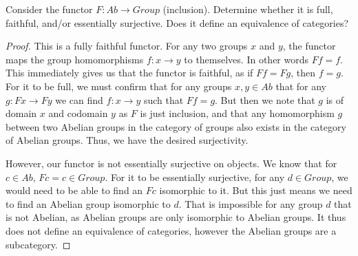 \documentclass[main.tex]{subfiles}
\begin{document}
%

\begin{exercise}
	Consider the functor $F: Ab \rightarrow Group$ (inclusion).  Determine whether it is full, faithful, and/or essentially surjective.  Does it define an equivalence of categories?
\end{exercise}

\begin{proof}
	This is a fully faithful functor. For any two groups $x$ and $y$, the functor maps the group homomorphisms $f: x \rightarrow y$ to themselves.  In other words $Ff = f$.  This immediately gives us that the functor is faithful, as if $Ff = Fg$, then $f = g$.  
For it to be full, we must confirm that for any groups $x,y \in Ab$ that for any $g: Fx \rightarrow Fy$ we can find $f: x \rightarrow y$ such that $Ff = g$.  But then we note that $g$ is of domain $x$ and codomain $y$ as $F$ is just inclusion, and that any homomorphism $g$ between two Abelian groups in the category of groups
also exists in the category of Abelian groups.  Thus, we have the desired surjectivity.


However, our functor is not essentially surjective on objects.  We know that for
$c \in Ab$, $Fc = c \in Group$.  For it to be essentially surjective, for any $d
\in Group$, we would need to be able to find an $Fc$ isomorphic to it.  But this
just means we need to find an Abelian group isomorphic to $d$.  That is
impossible for any group $d$ that is not Abelian, as Abelian groups are only
isomorphic to Abelian groups. It thus does not define an equivalence of
categories, however the Abelian groups are a subcategory. 
\end{proof}
\end{document}
